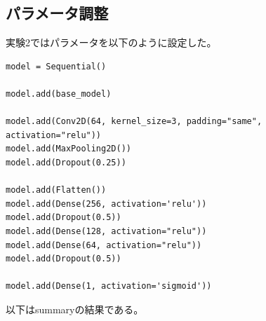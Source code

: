 \documentclass[a4paper, 11pt, titlepage]{jsarticle}
\begin{document}
\subsection{パラメータ調整}
実験2ではパラメータを以下のように設定した。\par
\begin{lstlisting}[caption=パラメータ(実験2),label=fuga]
model = Sequential()

model.add(base_model)

model.add(Conv2D(64, kernel_size=3, padding="same", activation="relu"))
model.add(MaxPooling2D())
model.add(Dropout(0.25))

model.add(Flatten())
model.add(Dense(256, activation='relu'))
model.add(Dropout(0.5))
model.add(Dense(128, activation="relu")) 
model.add(Dense(64, activation="relu")) 
model.add(Dropout(0.5))

model.add(Dense(1, activation='sigmoid'))

\end{lstlisting}\par
以下はsummaryの結果である。\par
\end{document}
